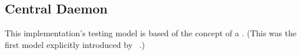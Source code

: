 \subsection{Central Daemon}
\label{sec:logic-repr:daemon}

This implementation's testing model is based of the concept of a .
(This was the first model explicitly introduced by \citeauthor{Dijkstra:1974:SSS:361179.361202}~\autocite{Dijkstra:1974:SSS:361179.361202}.)

